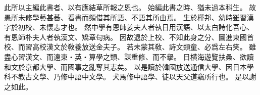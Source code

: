 此所以主編此書者、以有應結草所報之恩也。
始編此書之時、猶未過本科生。
故愚所未修學藝甚蕃、看書而頻借其所語、不語其所由焉。
生於槿邦、幼時雖習漢字於初校、未懷志才也。
然中學有恩師姜夫人者執日用漢語、以太白詩化吾心、有恩師朴夫人者執漢文、矯章句病。
因故退於上校、不知此身之分、圖進東國首校、而習高校漢文於敎養放送金夫子。
若未蒙其敎、詩文類童、必爲左右笑。
雖盡心習漢文、而遠東・英・算學之類、謀重修、而不擧。
日横海遊覽扶桑、欲讀和文於京都大學、而國事之亂奪其志矣。
以是讀於韓國放送通信大學、因日本學科不教古文學、乃修中語中文學。
犬馬修中語學、徒以天父道竊所行也。
是以謝之如此。
